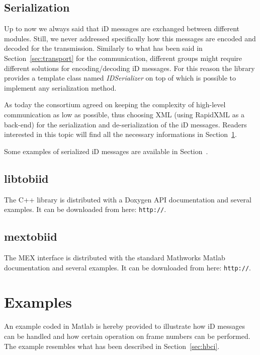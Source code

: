 \documentclass[a4paper,10pt]{article}
\begin{document}
\subsection{Serialization}
\label{sec:serialization}
Up to now we always said that iD messages are exchanged between different
modules. Still, we never addressed specifically how this messages are encoded
and decoded for the transmission.
Similarly to what has been said in Section~\ref{sec:transport} for the
communication, different groups might require different solutions for
encoding/decoding iD messages.
For this reason the library provides a template class named \emph{IDSerializer}
on top of which is possible to implement any serialization method.

As today the consortium agreed on keeping the complexity of high-level
communication as low as possible, thus choosing XML (using RapidXML as a
back-end) for the serialization and de-serialization of the iD messages.
Readers interested in this topic will find all the necessary informations in
Section~\ref{sec:examples}.

Some examples of serialized iD messages are available in
Section~\label{sec:code:single}.

\subsection{libtobiid}
\label{sec:libtobiid}
The C++ library is distributed with a Doxygen API documentation and several
examples. It can be downloaded from here: \small{\texttt{http://}}.

\subsection{mextobiid}
\label{sec:mextobiid}
The MEX interface is distributed with the standard Mathworks Matlab
documentation and several examples. It can be downloaded from here:
\small{\texttt{http://}}.


\section{Examples}
\label{sec:examples}
An example coded in Matlab is hereby provided to illustrate how iD messages can
be handled and how certain operation on frame numbers can be performed.
The example resembles what has been described in Section~\ref{sec:hbci}. 
\end{document}
